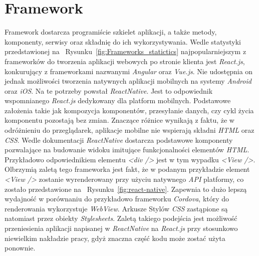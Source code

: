 \documentclass[skorowidz,skroty]{dyplomWEZUT}
\begin{document}
\section{Framework}\label{sec: framework}

Framework dostarcza programiście szkielet aplikacji, a także metody, komponenty, serwisy oraz składnię do ich wykorzystywania. Wedle statystyki przedstawionej na ~Rysunku~\ref{fig:Frameworks_statictics} \cite{FrameworksPopularity} najpopularniejszym z frameworków do tworzenia aplikacji webowych po stronie klienta jest \textit{React.js}, konkurujący z frameworkami nazwanymi \textit{Angular} oraz \textit{Vue.js}. Nie udostępnia on jednak możliwości tworzenia natywnych aplikacji mobilnych na systemy \textit{Android} oraz \textit{iOS}. Na te potrzeby powstał \textit{ReactNative}. Jest to odpowiednik wspomnianego \textit{React.js} dedykowany dla platform mobilnych. Podstawowe założenia takie jak kompozycja komponentów, przesyłanie danych, czy cykl życia komponentu pozostają bez zmian. Znaczące różnice wynikają z faktu, że w odróżnieniu do przeglądarek, aplikacje mobilne nie wspierają składni \textit{HTML} oraz \textit{CSS}. Wedle dokumentacji \cite{ReactNative} \textit{ReactNative} dostarcza podstawowe komponenty pozwalające na budowanie widoku imitujące funkcjonalności elementów \textit{HTML}. Przykładowo odpowiednikiem elementu \textit{<div />} jest w tym wypadku \textit{<View />}. Olbrzymią zaletą tego frameworka jest fakt, że w podanym przykładzie element \textit{<View />} zostanie wyrenderowany przy użyciu natywnego \textit{API} platformy, co zostało przedstawione na ~Rysunku~\ref{fig:react-native}. Zapewnia to dużo lepszą wydajność w porównaniu do przykładowo frameworku \textit{Cordova}, który do renderowania wykorzystuje \textit{WebView}. Arkusze Stylów \textit{CSS} zastąpione są natomiast przez obiekty \textit{Stylesheets}. Zaletą takiego podejścia jest możliwość przeniesienia aplikacji napisanej w \textit{ReactNative} na \textit{React.js} przy stosunkowo niewielkim nakładzie pracy, gdyż znaczna część kodu może zostać użyta ponownie. 
\end{document}

